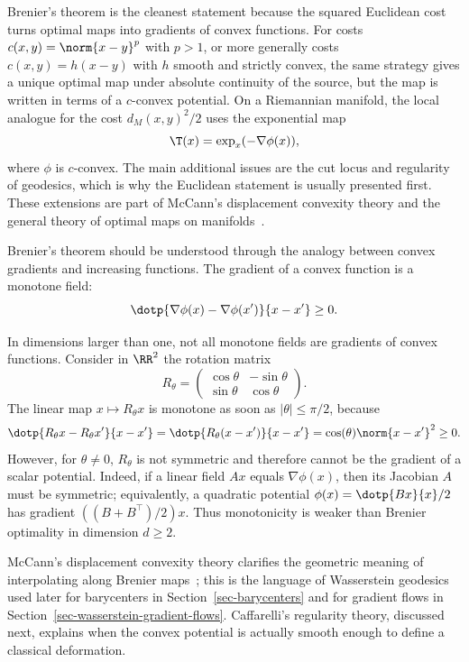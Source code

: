 \begin{rem}
	Brenier's theorem is the cleanest statement because the squared Euclidean cost turns optimal maps into gradients of convex functions. For costs $c(x,y)=\norm{x-y}^p$ with $p>1$, or more generally costs $c(x,y)=h(x-y)$ with $h$ smooth and strictly convex, the same strategy gives a unique optimal map under absolute continuity of the source, but the map is written in terms of a $c$-convex potential. On a Riemannian manifold, the local analogue for the cost $d_M(x,y)^2/2$ uses the exponential map
	\[
		\T(x)=\exp_x(-\nabla\phi(x)),
	\]
	where $\phi$ is $c$-convex. The main additional issues are the cut locus and regularity of geodesics, which is why the Euclidean statement is usually presented first. These extensions are part of McCann's displacement convexity theory and the general theory of optimal maps on manifolds~\cite{mccann1997convexity,Villani09}.
\end{rem}

Brenier's theorem should be understood through the analogy between convex gradients and increasing functions. The gradient of a convex function is a monotone field:
\[
	\dotp{\nabla\phi(x)-\nabla\phi(x')}{x-x'}\geq0.
\]

\begin{rem}
	In dimensions larger than one, not all monotone fields are gradients of convex functions. Consider in $\RR^2$ the rotation matrix
	\[
		R_\theta=\begin{pmatrix}
		\cos\theta & -\sin\theta\\
		\sin\theta & \cos\theta
		\end{pmatrix}.
	\]
	The linear map $x\mapsto R_\theta x$ is monotone as soon as $|\theta|\leq\pi/2$, because
	\[
		\dotp{R_\theta x-R_\theta x'}{x-x'}
		=
		\dotp{R_\theta(x-x')}{x-x'}
		=
		\cos(\theta)\norm{x-x'}^2\geq0.
	\]
	However, for $\theta\neq0$, $R_\theta$ is not symmetric and therefore cannot be the gradient of a scalar potential. Indeed, if a linear field $Ax$ equals $\nabla\phi(x)$, then its Jacobian $A$ must be symmetric; equivalently, a quadratic potential $\phi(x)=\dotp{Bx}{x}/2$ has gradient $((B+B^\top)/2)x$. Thus monotonicity is weaker than Brenier optimality in dimension $d\geq2$.
\end{rem}

McCann's displacement convexity theory clarifies the geometric meaning of interpolating along Brenier maps~\cite{mccann1997convexity}; this is the language of Wasserstein geodesics used later for barycenters in Section~\ref{sec-barycenters} and for gradient flows in Section~\ref{sec-wasserstein-gradient-flows}. Caffarelli's regularity theory, discussed next, explains when the convex potential is actually smooth enough to define a classical deformation.

